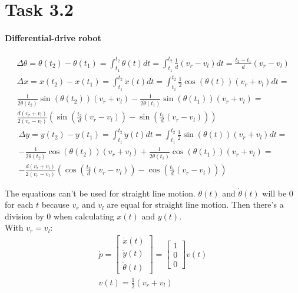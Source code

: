 \documentclass{article}
\begin{document}
	\section{Task 3.2}
	\paragraph{Differential-drive robot}
	
	\begin{gather}
	\Delta \theta = \theta(t_{2}) - \theta(t_{1}) = \int_{t_{1}}^{t_{2}} \dot{\theta}(t) dt = \int_{t_{1}}^{t_{2}} \frac{1}{d} (v_{r} - v_{l}) dt = \frac{t_{2} - t_{1}}{d} (v_{r} - v_{l})
	\end{gather}
	\begin{gather}
	\nonumber \Delta x = x(t_{2}) - x(t_{1}) = \int_{t_{1}}^{t_{2}} \dot{x}(t) dt = \int_{t_{1}}^{t_{2}} \frac{1}{2} \cos(\theta(t)) (v_{r} + v_{l}) dt =\\
	\nonumber \frac{1}{2 \dot{\theta}(t_{2})} \sin(\theta(t_{2})) (v_{r} + v_{l}) - \frac{1}{2 \dot{\theta}(t_{1})} \sin(\theta(t_{1})) (v_{r} + v_{l}) =\\
	\frac{d(v_{r} + v_{l})}{2(v_{r} - v_{l})}(\sin(\frac{t_{2}}{d}(v_{r} - v_{l})) - \sin(\frac{t_{1}}{d}(v_{r} - v_{l})))
	\end{gather}
	\begin{gather}
	\nonumber \Delta y = y(t_{2}) - y(t_{1}) = \int_{t_{1}}^{t_{2}} \dot{y}(t) dt = \int_{t_{1}}^{t_{2}} \frac{1}{2} \sin(\theta(t)) (v_{r} + v_{l}) dt =\\
	\nonumber -\frac{1}{2 \dot{\theta}(t_{2})} \cos(\theta(t_{2})) (v_{r} + v_{l}) + \frac{1}{2 \dot{\theta}(t_{1})} \cos(\theta(t_{1})) (v_{r} + v_{l}) =\\
	-\frac{d(v_{r} + v_{l})}{2(v_{r} - v_{l})}(\cos(\frac{t_{2}}{d}(v_{r} - v_{l})) - \cos(\frac{t_{1}}{d}(v_{r} - v_{l})))
	\end{gather}
	
	The equations can't be used for straight line motion. $\theta(t)$ and $\dot{\theta}(t)$ will be 0 for each $t$ because $v_{r}$ and $v_{l}$ are equal for straight line motion. Then there's a division by 0 when calculating $x(t)$ and $y(t)$.\\
	
	With $v_{r} = v_{l}$:
	\begin{gather}
	\dot{p} = 
	\begin{bmatrix}
	\dot{x}(t)\\
	\dot{y}(t)\\
	\dot{\theta}(t)
	\end{bmatrix} = 
	\begin{bmatrix}
	1\\
	0\\
	0
	\end{bmatrix} v(t)\\
	v(t) = \frac{1}{2}(v_{r} + v_{l})
	\end{gather}
	
\end{document}

